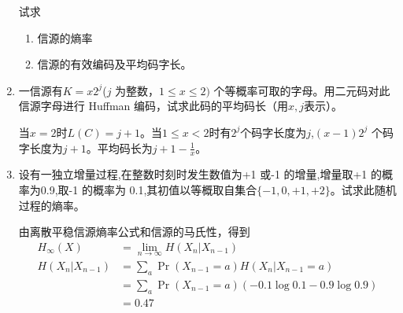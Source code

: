 \documentclass[a4paper]{article}
\begin{document}
\begin{enumerate}[label=\thehwcnt.\arabic*.]
试求
\begin{enumerate}[label=(\arabic*)]
\item 信源的熵率
\item 信源的有效编码及平均码字长。
\end{enumerate}
\item 一信源有$ K = x 2^j $($j$ 为整数，$1\leq x \leq 2)$ 个等概率可取的字母。用二元码对此信源字母进行 Huffman 编码，试求此码的平均码长（用$x,j$表示）。
\begin{solution}
当$x=2$时$L(C)=j+1$。当$1\leq x<2$时有$2^j$个码字长度为$j$,$(x-1)2^j$ 个码字长度为$j+1$。平均码长为$j+1-\frac{1}{x}$。
\end{solution}
\item 设有一独立增量过程,在整数时刻时发生数值为+1 或-1 的增量,增量取+1 的概率为0.9,取-1 的概率为 0.1,其初值以等概取自集合$\{-1,0,+1,+2\}$。试求此随机过程的熵率。
\begin{solution}
由离散平稳信源熵率公式和信源的马氏性，得到 
\begin{align*}
H_{\infty} (X)  & = \lim_{n\to \infty} H(X_n |X_{n-1}) \\
H(X_n|X_{n-1})  & = \sum_{a} \Pr(X_{n-1}=a) H(X_n|X_{n-1}=a) \\
& = \sum_{a} \Pr(X_{n-1}=a)(-0.1\log 0.1 - 0.9\log 0.9) \\
& = 0.47
\end{align*}
\end{solution}


\end{enumerate}
\end{document}
